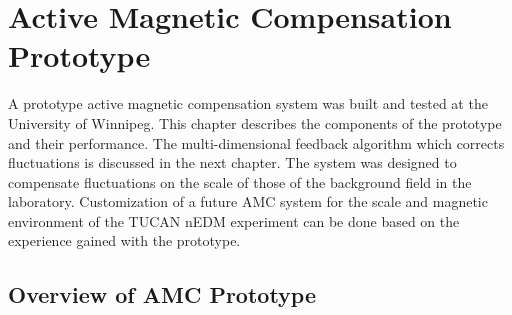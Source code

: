 \chapter{Active Magnetic Compensation Prototype}\label{ch:amcP}





A prototype active magnetic compensation system was built and tested at the University of Winnipeg. This chapter describes the components of the prototype and their performance. The multi-dimensional feedback algorithm which corrects fluctuations is discussed in the next chapter. The system was designed to compensate fluctuations on the scale of those of the background field in the laboratory. Customization of a future AMC system for the scale and magnetic environment of the TUCAN nEDM experiment can be done based on the experience gained with the prototype.



\section{Overview of AMC Prototype}\label{sec:amcp_overview}


